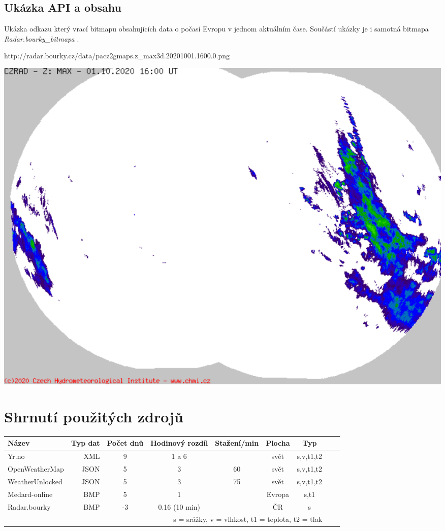 \documentclass[czech,bachelor,dept460,male,csharp,cpdeclaration]{diploma}
\begin{document}
	\subsection{Ukázka API a obsahu}
	
	Ukázka odkazu který vrací bitmapu obsahujících data o počasí Evropu v jednom aktuálním čase. Součástí ukázky je i samotná bitmapa \emph{Radar.bourky\_bitmapa} \cite{chmi}.
	
	http://radar.bourky.cz/data/pacz2gmaps.z\_max3d.20201001.1600.0.png
	
	\begin{center}
		\includegraphics[scale=0.5]{Data/Rb_ukazka.png}
	\end{center}
	
	\section{Shrnutí použitých zdrojů}
	
	\begin{center}
		
		
		\begin{tabular} {l r c c c c c c c}
			
			Název & Typ dat & Počet dnů & Hodinový rozdíl & Stažení/min & Plocha & Typ \\
			\hline
			Yr.no & XML & 9 & 1 a 6 & & svět & s,v,t1,t2 \\ 
			OpenWeatherMap & JSON & 5 & 3 & 60 & svět & s,v,t1,t2 \\ 
			WeatherUnlocked & JSON & 5 & 3 & 75 & svět & s,v,t1,t2 \\ 
			Medard-online & BMP & 5 & 1 &  & Evropa & s,t1 \\ 
			Radar.bourky & BMP & -3 & 0.16 (10 min)& & ČR & s \\ 
			
			\multicolumn{7}{r}{\footnotesize *s = srážky, v = vlhkost, t1 = teplota, t2 = tlak}\\
			
		\end{tabular}
	\end{center}
	
\end{document}
